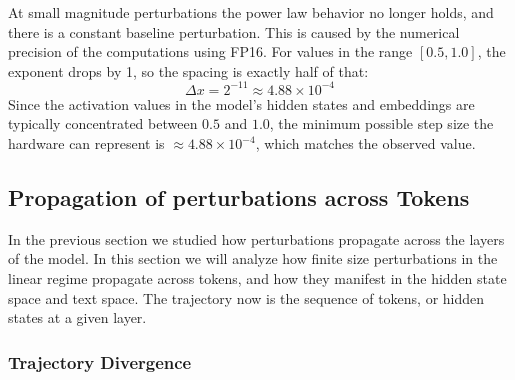 \documentclass[a4paper,12pt]{article}
\begin{document}
    At small magnitude perturbations the power law behavior no longer holds, and there is a constant baseline perturbation. This is caused by the numerical precision of the computations using FP16.
    For values in the range $[0.5, 1.0]$, the exponent drops by 1, so the spacing is exactly half of that: $$\Delta x = 2^{-11} \approx 4.88 \times 10^{-4}$$
    Since the activation values in the model's hidden states and embeddings are typically concentrated between $0.5$ and $1.0$, the minimum possible step size the hardware can represent is $ \approx 4.88 \times 10^{-4}$, which matches the observed value.


   


    \subsection{Propagation of perturbations across Tokens} \label{subsec:token_perturbations}

    In the previous section we studied how perturbations propagate across the layers of the model. In this section we will analyze how finite size perturbations in the linear regime propagate across tokens, and how they manifest in the hidden state space and text space. The trajectory now is the sequence of tokens, or hidden states at a given layer.

    \subsubsection{Trajectory Divergence} \label{res:trajectory_divergence}  
\end{document}
